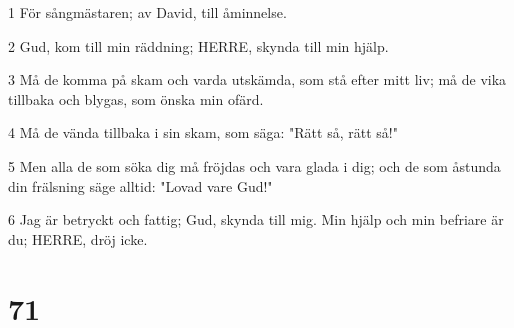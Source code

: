 \par 1 För sångmästaren; av David, till åminnelse.
\par 2 Gud, kom till min räddning; HERRE, skynda till min hjälp.
\par 3 Må de komma på skam och varda utskämda, som stå efter mitt liv; må de vika tillbaka och blygas, som önska min ofärd.
\par 4 Må de vända tillbaka i sin skam, som säga: "Rätt så, rätt så!"
\par 5 Men alla de som söka dig må fröjdas och vara glada i dig; och de som åstunda din frälsning säge alltid: "Lovad vare Gud!"
\par 6 Jag är betryckt och fattig; Gud, skynda till mig. Min hjälp och min befriare är du; HERRE, dröj icke.

\chapter{71}

